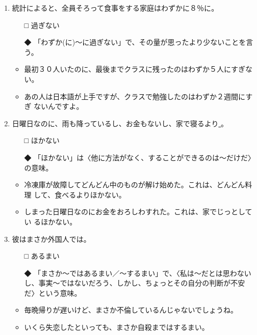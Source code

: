 \documentclass[
uplatex,
b5paper,
10pt,
dvipdfmx
]{jsbook}
\begin{document}
\begin{enumerate}
\item 統計によると、全員そろって食事をする家庭はわずかに８％に\underline{\hspace{3zw}}。

\begin{itemize}
\item[□]  過ぎない
\item[◆] 「わずか(に)〜に過ぎない」で、その量が思ったより少ないことを言う。
\end{itemize}
\begin{itemize}
\item 最初３０人いたのに、最後までクラスに残ったのはわずか５人にすぎない。
\item あの人は日本語が上手ですが、クラスで勉強したのはわずか２週間にすぎ
      ないんですよ。
\end{itemize}

\item 日曜日なのに、雨も降っているし、お金もないし、家で寝るより\underline{
       }。

\begin{itemize}
\item[□] ほかない
\item[◆] 「ほかない」は〈他に方法がなく、することができるのは〜だけだ〉
	  の意味。
\end{itemize}
\begin{itemize}
\item 冷凍庫が故障してどんどん中のものが解け始めた。これは、どんどん料理
      して、食べるよりほかない。
\item しまった日曜日なのにお金をおろしわすれた。これは、家でじっとしてい
      るほかない。
\end{itemize}

\item 彼はまさか外国人では\underline{\hspace{3zw}}。

\begin{itemize}
\item[□]  あるまい
\item[◆] 「まさか〜ではあるまい／〜するまい」で、〈私は〜だとは思わない
	  し、事実〜ではないだろう、しかし、ちょ{}っとその自分の判断が不安
	  だ〉という意味。
\end{itemize}
\begin{itemize}
\item 毎晩帰りが遅いけど、まさか不倫しているんじゃないでしょうね。
\item いくら失恋したといっても、まさか自殺まではするまい。
\end{itemize}


\end{enumerate}
\end{document}
